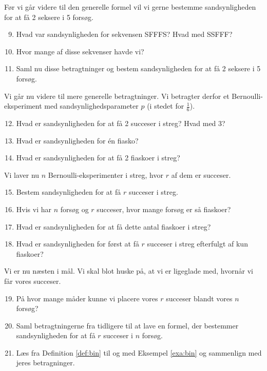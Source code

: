 Før vi går videre til den generelle formel vil vi gerne bestemme sandsynligheden for at få 2 seksere i 5 forsøg.
\begin{enumerate}[label=\roman*)]
	\setcounter{enumi}{8}
	\item Hvad var sandsynligheden for sekvensen SFFFS? Hvad med SSFFF?
	\item Hvor mange af disse sekvenser havde vi?
	\item Saml nu disse betragtninger og bestem sandsynligheden for at få 2 seksere i 5 forsøg.
\end{enumerate}
Vi går nu videre til mere generelle betragtninger. Vi betragter derfor et Bernoulli-eksperiment med sandsynlighedsparameter $p$ (i stedet for $\frac{1}{6}$).
\begin{enumerate}[label=\roman*)]
	\setcounter{enumi}{11}
	\item Hvad er sandsynligheden for at få 2 succeser i streg? Hvad med 3?
	\item Hvad er sandsynligheden for én fiasko? 
	\item Hvad er sandsynligheden for at få 2 fiaskoer i streg?
\end{enumerate}
Vi laver nu $n$ Bernoulli-eksperimenter i streg, hvor $r$ af dem er succeser. 
\begin{enumerate}[label=\roman*)]
	\setcounter{enumi}{14}	
	\item Bestem sandsynligheden for at få $r$ succeser i streg.
	\item Hvis vi har $n$ forsøg og $r$ succeser, hvor mange forsøg er så fiaskoer?
	\item Hvad er sandsynligheden for at få dette antal fiaskoer i streg?
	\item Hvad er sandsynligheden for først at få $r$ succeser i streg efterfulgt af kun fiaskoer?
\end{enumerate}
Vi er nu næsten i mål. Vi skal blot huske på, at vi er ligeglade med, hvornår vi får vores succeser. 
\begin{enumerate}[label = \roman*)]
	\setcounter{enumi}{18}
	\item På hvor mange måder kunne vi placere vores $r$ succeser blandt vores $n$ forsøg?
	\item Saml betragtningerne fra tidligere til at lave en formel, der bestemmer sandsynligheden for at få $r$ succeser i $n$ forsøg. 
	\item Læs fra Definition \ref{def:bin} til og med Eksempel \ref{exa:bin} og sammenlign med jeres betragninger.
\end{enumerate}







